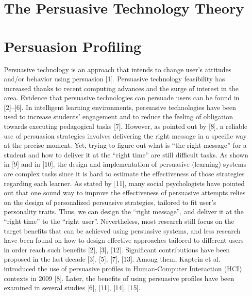 \section{The Persuasive Technology Theory}
\lipsum[1]

\section{Persuasion Profiling}

Persuasive technology is an approach that intends to change user’s attitudes and/or behavior using persuasion [1]. Persuasive technology feasibility has increased thanks to recent computing advances and the surge of interest in the area. Evidence that persuasive technologies can persuade users can be found in [2]–[6]. In intelligent learning environments, persuasive technologies have been used to increase students’ engagement and to reduce the feeling of obligation towards executing pedagogical tasks [7]. However, as pointed out by [8], a reliable use of persuasion strategies involves delivering the right message in a specific way at the precise moment. Yet, trying to figure out what is “the right message” for a student and how to deliver it at the “right time” are still difficult tasks. 
As shown in [9] and in [10], the design and implementation of persuasive (learning) systems are complex tasks since it is hard to estimate the effectiveness of those strategies regarding each learner. As stated by [11], many social psychologists have pointed out that one sound way to improve the effectiveness of persuasive attempts relies on the design of personalized persuasive strategies, tailored to fit user’s personality traits. Thus, we can design the “right message”, and deliver it at the “right time” to the “right user”. Nevertheless, most research still focus on the target benefits that can be achieved using persuasive systems, and less research have been found on how to design effective approaches tailored to different users in order reach such benefits [2], [3], [12]. Significant contributions have been proposed in the last decade [3], [5], [7], [13]. Among them, Kaptein et al. introduced the use of persuasive profiles in Human-Computer Interaction (HCI) contexts in 2009 [8]. Later, the benefits of using persuasive profiles have been examined in several studies [6], [11], [14], [15]. 
